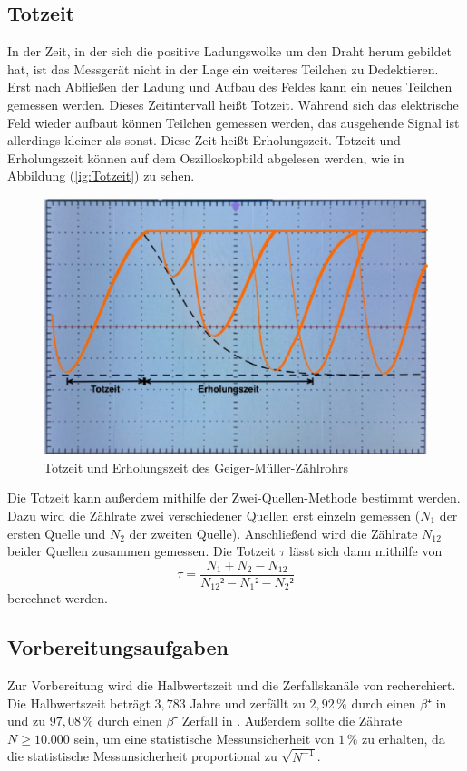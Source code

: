 \subsection{Totzeit}
In der Zeit, in 
der sich die positive Ladungswolke um den Draht herum gebildet hat, ist das Messgerät
nicht in der Lage ein weiteres Teilchen zu Dedektieren. Erst nach Abfließen der Ladung
und Aufbau des Feldes kann ein neues Teilchen gemessen werden. Dieses Zeitintervall
heißt Totzeit. Während sich das elektrische Feld wieder aufbaut können Teilchen gemessen 
werden, das ausgehende Signal ist allerdings kleiner als sonst. Diese Zeit heißt
Erholungszeit. Totzeit und Erholungszeit können auf dem Oszilloskopbild abgelesen werden,
wie in Abbildung (\ref{ig:Totzeit}) zu sehen. 
\begin{figure}[H]
    \centering
    \includegraphics[width=\textwidth]{content/Bilder/Oszilloskop.png}
    \caption{Totzeit und Erholungszeit des Geiger-Müller-Zählrohrs}
    \label{fig:Totzeit}
\end{figure}
Die Totzeit kann außerdem mithilfe der Zwei-Quellen-Methode bestimmt werden. Dazu wird die Zählrate 
zwei verschiedener Quellen erst einzeln gemessen ($N_1$ der ersten Quelle und $N_2$ der zweiten Quelle).
Anschließend wird die Zählrate $N_{12}$ beider Quellen zusammen gemessen. Die Totzeit $\tau$
lässt sich dann mithilfe von 
\begin{equation}
    \tau = \frac{N_1 + N_2 - N_{12}}{N_{12}² - N_1² - N_2²}
\end{equation}
berechnet werden. 
\subsection{Vorbereitungsaufgaben}
\label{sec:Vorbereitungsaufgaben}
Zur Vorbereitung wird die Halbwertszeit und die Zerfallskanäle von 
recherchiert. Die Halbwertszeit beträgt $3,783$ Jahre und 
zerfällt zu $2,92 \, \%$ durch einen $\beta⁺$ in  und zu $97,08 \, \%$ 
durch einen $\beta⁻$ Zerfall in  \cite{vorbereitung}. 
Außerdem sollte die Zährate $N \geq 10.000$ sein, um eine statistische Messunsicherheit
von $1 \, \%$ zu erhalten, da die statistische Messunsicherheit proportional zu 
$\sqrt{N^{-1}}$.
